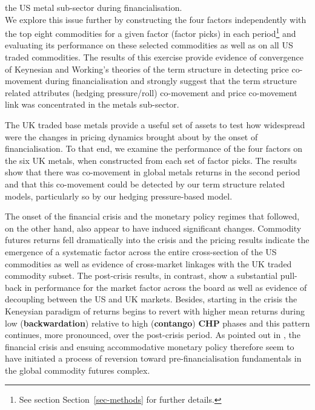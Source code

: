 \documentclass[
  authoryear,
  preprint,
  3p]{elsarticle}
\begin{document}
the US metal sub-sector during financialisation.\\
We explore this issue further by constructing the four factors
independently with the top eight commodities for a given factor (factor
picks) in each period\footnote{See section Section~\ref{sec-methods} for
  further details.} and evaluating its performance on these selected
commodities as well as on all US traded commodities. The results of this
exercise provide evidence of convergence of Keynesian and Working's
theories of the term structure in detecting price co-movement during
financialisation and strongly suggest that the term structure related
attributes (hedging pressure/roll) co-movement and price co-movement
link was concentrated in the metals sub-sector.

\medskip

The UK traded base metals provide a useful set of assets to test how
widespread were the changes in pricing dynamics brought about by the
onset of financialisation. To that end, we examine the performance of
the four factors on the six UK metals, when constructed from each set of
factor picks. The results show that there was co-movement in global
metals returns in the second period and that this co-movement could be
detected by our term structure related models, particularly so by our
hedging pressure-based model.

\medskip

The onset of the financial crisis and the monetary policy regimes that
followed, on the other hand, also appear to have induced significant
changes. Commodity futures returns fell dramatically into the crisis and
the pricing results indicate the emergence of a systematic factor across
the entire cross-section of the US commodities as well as evidence of
cross-market linkages with the UK traded commodity subset. The
post-crisis results, in contrast, show a substantial pull-back in
performance for the market factor across the board as well as evidence
of decoupling between the US and UK markets. Besides, starting in the
crisis the Keneysian paradigm of returns begins to revert with higher
mean returns during low (\textbf{backwardation}) relative to high
(\textbf{contango}) \textbf{CHP} phases and this pattern continues, more
pronounced, over the post-crisis period. As pointed out in
\citet{basu_definancialisation}, the financial crisis and ensuing
accommodative monetary policy therefore seem to have initiated a process
of reversion toward pre-financialisation fundamentals in the global
commodity futures complex.
\end{document}
